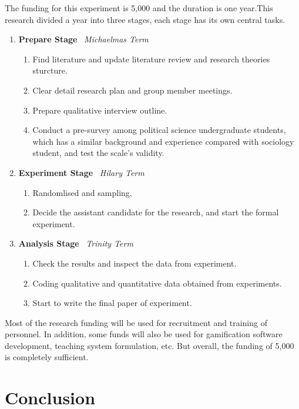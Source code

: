 \documentclass[12pt]{article} %
\begin{document}
\noindent The funding for this experiment is 5,000 \texteuro{} and the duration is one year.This research divided a year into three stages, each stage has its own central tasks.
\begin{enumerate}[topsep=0pt]
	\item \textbf{Prepare Stage} \textendash\ \textit{Michaelmas Term}
		\begin{enumerate}
			\item Find literature and update literature review and research theories sturcture.
			\item Clear detail research plan and group member meetings.
			\item Prepare qualitative interview outline.
			\item Conduct a pre-survey among political science undergraduate students, which has a similar background and experience compared with sociology student, and test the scale's validity.
		\end{enumerate}
	\item \textbf{Experiment Stage} \textendash\ \textit{Hilary Term}
		\begin{enumerate}
			\item Randomlised and sampling, 
			\item Decide the assistant candidate for the research, and start the formal experiment.
		\end{enumerate}
	\item \textbf{Analysis Stage} \textendash\ \textit{Trinity Term}
		\begin{enumerate}
			\item Check the results and inspect the data from experiment.
			\item Coding qualitative and quantitative data obtained from experiments.
			\item Start to write the final paper of experiment.
		\end{enumerate}
\end{enumerate}
\noindent Most of the research funding will be used for recruitment and training of personnel. In addition, some funds will also be used for gamification software development, teaching system formulation, etc. But overall, the funding of 5,000 \texteuro{} is completely sufficient.

\newpage

\section*{Conclusion}
\end{document}
